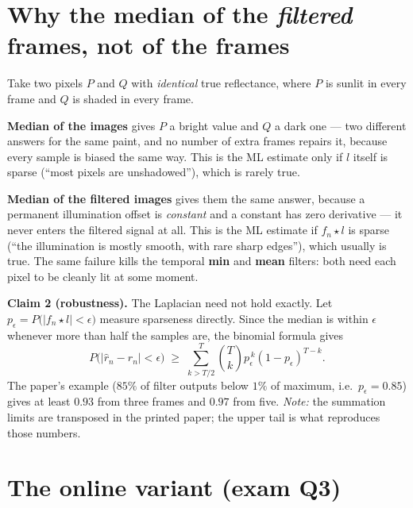 \documentclass[11pt]{article}
\begin{document}
\section{Why the median of the \emph{filtered} frames, not of the frames}

\begin{qbox}
Take two pixels $P$ and $Q$ with \emph{identical} true reflectance, where $P$ is sunlit in every frame and $Q$
is shaded in every frame.
\end{qbox}

\noindent\textbf{Median of the images} gives $P$ a bright value and $Q$ a dark one --- two different answers for
the same paint, and no number of extra frames repairs it, because every sample is biased the same way. This is
the ML estimate only if $l$ itself is sparse (``most pixels are unshadowed''), which is rarely true.

\medskip
\noindent\textbf{Median of the filtered images} gives them the same answer, because a permanent illumination
offset is \emph{constant} and a constant has zero derivative --- it never enters the filtered signal at all.
This is the ML estimate if $f_n \star l$ is sparse (``the illumination is mostly smooth, with rare sharp
edges''), which usually is true. The same failure kills the temporal \textbf{min} and \textbf{mean} filters:
both need each pixel to be cleanly lit at some moment.

\begin{notebox}\textbf{Claim 2 (robustness).} The Laplacian need not hold exactly. Let
$p_\epsilon = P\bigl(|f_n \star l| < \epsilon\bigr)$ measure sparseness directly. Since the median is within
$\epsilon$ whenever more than half the samples are, the binomial formula gives
\[
  P\bigl(|\hat r_n - r_n| < \epsilon\bigr) \;\ge\; \sum_{k>T/2}^{T} \binom{T}{k} p_\epsilon^{\,k}(1-p_\epsilon)^{T-k}.
\]
The paper's example ($85\%$ of filter outputs below $1\%$ of maximum, i.e.\ $p_\epsilon=0.85$) gives at least
$0.93$ from three frames and $0.97$ from five.
\emph{Note:} the summation limits are transposed in the printed paper; the upper tail is what reproduces those
numbers.\end{notebox}

\section{The online variant (exam Q3)}
\end{document}

